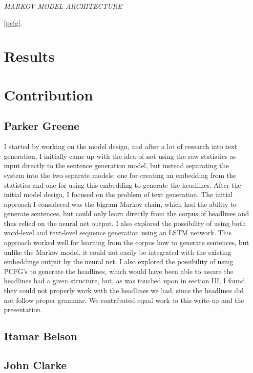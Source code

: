 \documentclass[12pt, journal]{IEEEtran}
\begin{document}
\emph{MARKOV MODEL ARCHITECTURE}


\ref{pcfg}.

\section{Results}

\section{Contribution}

\subsection{Parker Greene}

I started by working on the model design, and after a lot of research into text generation, I initially came up with the idea of not using the raw statistics as input directly to the sentence generation model, but instead separating the system into the two separate models: one for creating an embedding from the statistics and one for using this embedding to generate the headlines. After the initial model design, I focused on the problem of text generation. The initial approach I considered was the bigram Markov chain, which had the ability to generate sentences, but could only learn directly from the corpus of headlines and thus relied on the neural net output. I also explored the possibility of using both word-level and text-level sequence generation using an LSTM network. This approach worked well for learning from the corpus how to generate sentences, but unlike the Markov model, it could not easily be integrated with the existing embeddings output by the neural net. I also explored the possibility of using PCFG's to generate the headlines, which would have been able to assure the headlines had a given structure, but, as was touched upon in section III, I found they could not properly work with the headlines we had, since the headlines did not follow proper grammar. We contributed equal work to this write-up and the presentation.

\subsection{Itamar Belson}

\subsection{John Clarke}
\end{document}
